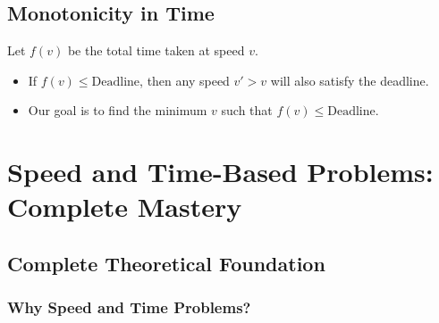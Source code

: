 \documentclass[11pt,a4paper,oneside]{book}
\begin{document}
\subsection{Monotonicity in Time}
Let $f(v)$ be the total time taken at speed $v$.
\begin{itemize}
    \item If $f(v) \leq \text{Deadline}$, then any speed $v' > v$ will also satisfy the deadline.
    \item Our goal is to find the minimum $v$ such that $f(v) \leq \text{Deadline}$.
\end{itemize}

\section{Speed and Time-Based Problems: Complete Mastery}

\subsection{Complete Theoretical Foundation}

\subsubsection{Why Speed and Time Problems?}
\end{document}
